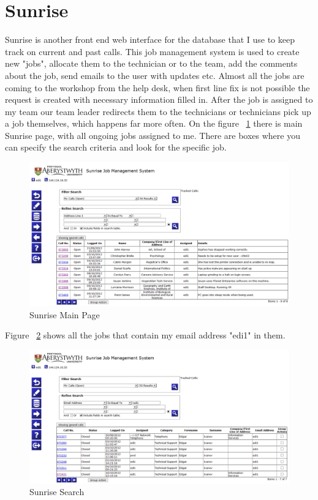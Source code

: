 \documentclass[10pt,a4paper,headinclude=true]{report}
\begin{document}
\section{Sunrise}
Sunrise is another front end web interface for the database that I use to keep track on current and past calls. This job management system is used to create new "jobs", allocate them to the technician or to the team, add the comments about the job, send emails to the user with updates etc. Almost all the jobs are coming to the workshop from the help desk, when first line fix is not possible the request is created with necessary information filled in. After the job is assigned to my team our team leader redirects them to the technicians or technicians pick up a job themselves, which happens far more often. On the figure ~\ref{fig:sunrise_main} there is main Sunrise page, with all ongoing jobs assigned to me. There are boxes where you can specify the search criteria and look for the specific job.

\begin{figure}[H]
\centering
\centerline{\includegraphics[scale=0.5]{./sunrise_main}}
\caption{Sunrise Main Page}
\label{fig:sunrise_main}
\end{figure}

Figure ~\ref{fig:sunrise_search} shows all the jobs that contain my email address "edi1" in them.

\begin{figure}[H]
\centering
\centerline{\includegraphics[scale=0.4]{./sunrise_search}}
\caption{Sunrise Search}
\label{fig:sunrise_search}
\end{figure}
\end{document}
